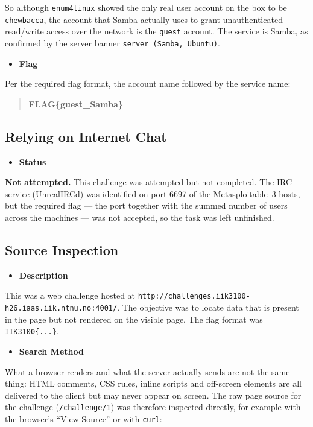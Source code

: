 \documentclass[11pt]{article}
\begin{document}
\noindent So although \texttt{enum4linux} showed the only real user account on the box to be \texttt{chewbacca}, the account that Samba actually uses to grant unauthenticated read/write access over the network is the \texttt{guest} account. The service is Samba, as confirmed by the server banner \texttt{server (Samba, Ubuntu)}.

\begin{itemize}[leftmargin=1.5em]
    \item \textbf{Flag}
\end{itemize}
\noindent Per the required flag format, the account name followed by the service name:

\begin{quote}
\textbf{FLAG\{guest\_Samba\}}
\end{quote}

\subsection{Relying on Internet Chat}

\begin{itemize}[leftmargin=1.5em]
    \item \textbf{Status}
\end{itemize}
\noindent \textbf{Not attempted.} This challenge was attempted but not completed. The IRC service (UnrealIRCd) was identified on port 6697 of the Metasploitable~3 hosts, but the required flag --- the port together with the summed number of users across the machines --- was not accepted, so the task was left unfinished.

\subsection{Source Inspection}

\begin{itemize}[leftmargin=1.5em]
    \item \textbf{Description}
\end{itemize}
\noindent This was a web challenge hosted at \texttt{http://challenges.iik3100-h26.iaas.iik.ntnu.no:4001/}. The objective was to locate data that is present in the page but not rendered on the visible page. The flag format was \texttt{IIK3100\{...\}}.

\begin{itemize}[leftmargin=1.5em]
    \item \textbf{Search Method}
\end{itemize}
\noindent What a browser renders and what the server actually sends are not the same thing: HTML comments, CSS rules, inline scripts and off-screen elements are all delivered to the client but may never appear on screen. The raw page source for the challenge (\texttt{/challenge/1}) was therefore inspected directly, for example with the browser's ``View Source'' or with \texttt{curl}:
\end{document}
